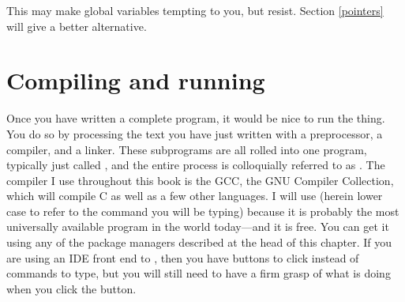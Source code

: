 \documentclass[12pt]{article}
\begin{document}
This may make global variables tempting to you, but resist. Section \ref{pointers} will give a better
alternative.

\section{Compiling and running}\label{compilation}  

Once you have written a complete program, it would be nice to run the
thing. You do so by processing the text you have just written with a
preprocessor, a compiler, and a linker. These subprograms are all rolled
into one program, typically just called , and the entire
process is colloquially referred to as . The compiler I use
throughout this book is the GCC, the GNU Compiler Collection, which will
compile C as well as a few other languages. I will use  (herein
lower case to refer to the command you will be typing) because it is probably
the most universally available program in the world today---and it is free.
You can get it using any of the package managers described at the head
of this chapter. If you are using an IDE front end to ,
then you have buttons to click instead of commands to type, but you will
still need to have a firm grasp of what  is doing when you
click the  button.
\end{document}
